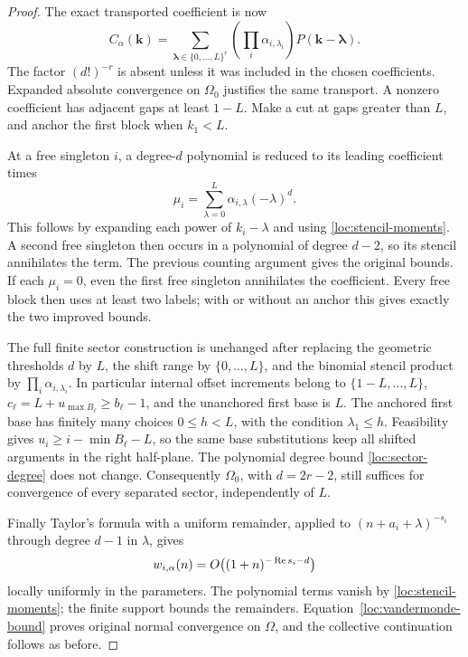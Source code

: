 \begin{proof}
The exact transported coefficient is now
\begin{equation}
 C_\alpha(\mathbf k)=
   \sum_{\boldsymbol\lambda\in\{0,\ldots,L\}^r}
          \left(\prod_i\alpha_{i,\lambda_i}\right)
          P(\mathbf k-\boldsymbol\lambda).
 \label{loc:general-coefficient}
\end{equation}
The factor $(d!)^{-r}$ is absent unless it was included in the chosen
coefficients.  Expanded absolute convergence on $\Omega_0$ justifies
the same transport.  A nonzero coefficient has adjacent gaps at least
$1-L$.  Make a cut at gaps greater than $L$, and anchor the first
block when $k_1<L$.

At a free singleton $i$, a degree-$d$ polynomial is reduced to its
leading coefficient times
\[
 \mu_i=\sum_{\lambda=0}^L
                 \alpha_{i,\lambda}(-\lambda)^d.
\]
This follows by expanding each power of $k_i-\lambda$ and using
\eqref{loc:stencil-moments}.  A second free singleton then occurs in
a polynomial of degree $d-2$, so its stencil annihilates the term.
The previous counting argument gives the original bounds.  If each
$\mu_i=0$, even the first free singleton annihilates the coefficient.
Every free block then uses at least two labels; with or without an
anchor this gives exactly the two improved bounds.

The full finite sector construction is unchanged after replacing the
geometric thresholds $d$ by $L$, the shift range by $\{0,\ldots,L\}$,
and the binomial stencil product by $\prod_i\alpha_{i,\lambda_i}$.
In particular internal offset increments belong to
$\{1-L,\ldots,L\}$, $c_\ell=L+u_{\max B_\ell}\ge b_\ell-1$, and
the unanchored first base is $L$.  The anchored first base has finitely
many choices $0\le h<L$, with the condition $\lambda_1\le h$.
Feasibility gives $u_i\ge i-\min B_\ell-L$, so the same base
substitutions keep all shifted arguments in the right half-plane.
The polynomial degree bound \eqref{loc:sector-degree} does not change.
Consequently $\Omega_0$, with $d=2r-2$, still suffices for convergence
of every separated sector, independently of $L$.

Finally Taylor's formula with a uniform remainder, applied to
$(n+a_i+\lambda)^{-s_i}$ through degree $d-1$ in $\lambda$, gives
\[
 w_{i,\alpha}(n)=O\bigl((1+n)^{-\operatorname{Re} s_i-d}\bigr)
\]
locally uniformly in the parameters.  The polynomial terms vanish by
\eqref{loc:stencil-moments}; the finite support bounds the remainders.
Equation~\eqref{loc:vandermonde-bound} proves original normal
convergence on $\Omega$, and the collective continuation follows as
before.
\end{proof}

